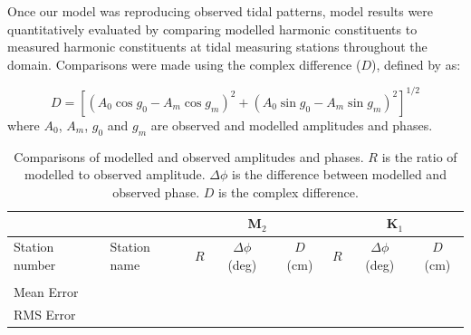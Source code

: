 \documentclass[pdftex,10pt]{article}
\begin{document}

Once our model was reproducing observed tidal patterns, model results were quantitatively evaluated by comparing modelled harmonic constituents to measured harmonic constituents at tidal measuring stations throughout the domain. Comparisons were made using the complex difference ($D$), defined by \citep{foreman1995tidal} as:

\begin{equation}
D = [(A_0 \cos g_0 - A_m \cos g_m)^2 + (A_0 \sin g_0 - A_m \sin g_m)^2]^{1/2}
\end{equation}\label{eq:compdiff}
where $A_0$, $A_m$, $g_0$ and $g_m$ are observed and modelled amplitudes and phases.


\begin{table}[h]
\centering 
\begin{tabular}{l l c c c c c c} 
\hline 
& & \multicolumn{3}{c}{M$_2$} & \multicolumn{3}{c}{K$_1$} \\ 
\hline 
Station number & Station name & $R$ & $ \Delta \phi$ (deg) & $D$ (cm) & $R$ & $ \Delta \phi$ (deg) & $D$ (cm) \\
\hline 
               &              &     &                      &          &     &                      &          \\
\hline   
Mean Error     &              &     &                      &          &     &                      &          \\
RMS Error      &              &     &                      &          &     &                      &          \\
\hline  
\end{tabular}
\caption{Comparisons of modelled and observed amplitudes and phases. $R$ is the ratio of modelled to observed amplitude. $\Delta \phi$ is the difference between modelled and observed phase. $D$ is the complex difference. }
\label{tab:comparison} 
\end{table}
\end{document}
